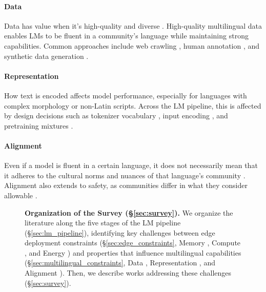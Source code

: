 \documentclass[11pt,a4paper]{article}
\begin{document}
\paragraph{\icondata{} Data}
Data has value when it's high-quality and diverse \citep{raventos2023pretraining,chen2024diversitysyntheticdataimpact}.
High-quality multilingual data enables LMs to be fluent in a community's language while maintaining strong capabilities.
Common approaches include web crawling \citep{penedo2025fineweb}, human annotation \citep{singh-etal-2024-aya}, and synthetic data generation \citep{dang2024ayaexpansecombiningresearch}.

\paragraph{\iconrepresentation{} Representation}
How text is encoded affects model performance, especially for languages with complex morphology or non-Latin scripts.
Across the LM pipeline, this is affected by design decisions such as tokenizer vocabulary \citep{rust-etal-2021-good}, input encoding \citep{minixhofer2026bolmobyteifyinggenerationlanguage}, and pretraining mixtures \citep{conneau-etal-2020-unsupervised}.

\paragraph{\iconalignment{} Alignment}
Even if a model is fluent in a certain language, it does not necessarily mean that it adheres to the cultural norms and nuances of that language's community \citep{adilazuarda-etal-2024-towards,liu-etal-2025-culturally}.
Alignment also extends to safety, as communities differ in what they consider allowable \citep{yong-etal-2025-state}.

\begin{figure}[t!]
  \centering
  
  \caption{
    \textbf{Organization of the Survey (\S\ref{sec:survey}).}
    We organize the literature along the five stages of the LM pipeline (\S\ref{sec:lm_pipeline}),
    identifying key challenges between edge deployment constraints (\S\ref{sec:edge_constraints}, Memory \iconmemory{}, Compute \iconcompute{}, and Energy \iconenergy{})
    and properties that influence multilingual capabilities (\S\ref{sec:multilingual_constraints}, Data \icondata{}, Representation \iconrepresentation{}, and Alignment \iconalignment{}).
    Then, we describe works addressing these challenges (\S\ref{sec:survey}).
  }
  \label{fig:taxonomy}
\end{figure}
\end{document}
